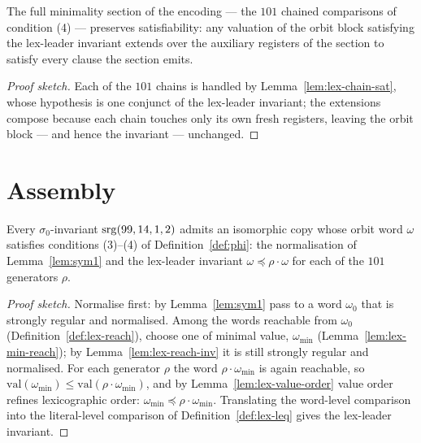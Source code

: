 \begin{proposition}\label{prop:lex-section-trip}
The full minimality section of the encoding — the $101$ chained comparisons
of condition (4) — preserves satisfiability: any valuation of the orbit
block satisfying the lex-leader invariant extends over the auxiliary
registers of the section to satisfy every clause the section emits.
\leanok
{}
\end{proposition}

\begin{proof}[Proof sketch]
Each of the $101$ chains is handled by Lemma~\ref{lem:lex-chain-sat}, whose
hypothesis is one conjunct of the lex-leader invariant; the extensions
compose because each chain touches only its own fresh registers, leaving the
orbit block — and hence the invariant — unchanged.
\end{proof}

\section{Assembly}

\begin{theorem}\label{thm:lex-complete}
Every $\sigma_0$-invariant $\mathrm{srg}(99,14,1,2)$ admits an isomorphic copy whose
orbit word $\omega$ satisfies conditions (3)--(4) of
Definition~\ref{def:phi}: the normalisation of Lemma~\ref{lem:sym1} and the
lex-leader invariant $\omega \preceq \rho\cdot\omega$ for each of the $101$
generators $\rho$.
\leanok
{}
\end{theorem}

\begin{proof}[Proof sketch]
Normalise first: by Lemma~\ref{lem:sym1} pass to a word $\omega_0$ that is
strongly regular and normalised.  Among the words reachable from $\omega_0$
(Definition~\ref{def:lex-reach}), choose one of minimal value,
$\omega_{\min}$ (Lemma~\ref{lem:lex-min-reach}); by
Lemma~\ref{lem:lex-reach-inv} it is still strongly regular and normalised.
For each generator $\rho$ the word $\rho\cdot\omega_{\min}$ is again
reachable, so
$\mathrm{val}(\omega_{\min}) \le \mathrm{val}(\rho\cdot\omega_{\min})$, and
by Lemma~\ref{lem:lex-value-order} value order refines lexicographic order:
$\omega_{\min} \preceq \rho\cdot\omega_{\min}$.  Translating the word-level
comparison into the literal-level comparison of
Definition~\ref{def:lex-leq} gives the lex-leader invariant.
\end{proof}

